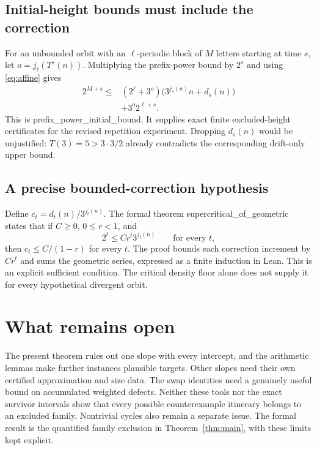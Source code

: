 \documentclass[11pt]{article}
\theoremstyle{remark}
\newcommand{\code}[1]{{\small\ttfamily #1}}
\begin{document}
\subsection{Initial-height bounds must include the correction}
For an unbounded orbit with an $\ell$-periodic block of $M$ letters
starting at time $s$, let $o=j_\ell(T^s(n))$. Multiplying the prefix-power
bound by $2^s$ and using \eqref{eq:affine} gives
\begin{equation}\label{eq:seedbound}
\begin{split}
2^{M+s}\le{}&(2^\ell+3^o)\bigl(3^{j_s(n)}n+d_s(n)\bigr)\\
&+3^o2^{\ell+s}.
\end{split}
\end{equation}
This is \code{prefix\_\allowbreak{}power\_\allowbreak{}initial\_\allowbreak{}bound}. It supplies exact finite
excluded-height certificates for the revised repetition experiment.
Dropping $d_s(n)$ would be unjustified: $T(3)=5>3\cdot3/2$ already
contradicts the corresponding drift-only upper bound.

\subsection{A precise bounded-correction hypothesis}
Define $c_t=d_t(n)/3^{j_t(n)}$. The formal theorem
\code{supercritical\_\allowbreak{}of\_\allowbreak{}geometric} states that if $C\ge0$, $0\le r<1$,
and
\[
2^t\le Cr^t3^{j_t(n)}\qquad\text{for every }t,
\]
then $c_t\le C/(1-r)$ for every $t$. The proof bounds each correction
increment by $Cr^t$ and sums the geometric series, expressed as a finite
induction in Lean. This is an explicit sufficient condition. The
critical density floor alone does not supply it for every hypothetical
divergent orbit.

\newpage
\section{What remains open}
The present theorem rules out one slope with every intercept, and the
arithmetic lemmas make further instances plausible targets. Other slopes
need their own certified approximation and size data. The swap identities
need a genuinely useful bound on accumulated weighted defects. Neither
these tools nor the exact survivor intervals show that every possible
counterexample itinerary belongs to an excluded family. Nontrivial cycles
also remain a separate issue. The formal result is the quantified family
exclusion in Theorem~\ref{thm:main}, with these limits kept explicit.
\end{document}
